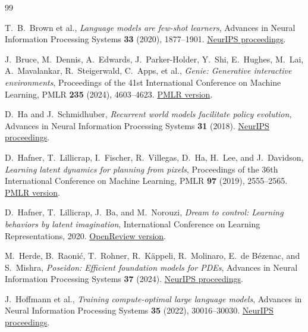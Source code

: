 \documentclass[11pt]{amsart}
\numberwithin{equation}{section}
\theoremstyle{definition}
\theoremstyle{plain}
\theoremstyle{remark}
\begin{document}
\begin{thebibliography}{99}

T.~B.~Brown et al.,
\emph{Language models are few-shot learners},
Advances in Neural Information Processing Systems \textbf{33} (2020),
1877--1901.
\href{https://proceedings.neurips.cc/paper/2020/hash/1457c0d6bfcb4967418bfb8ac142f64a-Abstract.html}
{NeurIPS proceedings}.

J.~Bruce, M.~Dennis, A.~Edwards, J.~Parker-Holder, Y.~Shi, E.~Hughes,
M.~Lai, A.~Mavalankar, R.~Steigerwald, C.~Apps, et al.,
\emph{Genie: Generative interactive environments},
Proceedings of the 41st International Conference on Machine Learning,
PMLR \textbf{235} (2024), 4603--4623.
\href{https://proceedings.mlr.press/v235/bruce24a.html}{PMLR version}.

D.~Ha and J.~Schmidhuber,
\emph{Recurrent world models facilitate policy evolution},
Advances in Neural Information Processing Systems \textbf{31} (2018).
\href{https://papers.nips.cc/paper_files/paper/2018/hash/2de5d16682c3c35007e4e92982f1a2ba-Abstract.html}
{NeurIPS proceedings}.

D.~Hafner, T.~Lillicrap, I.~Fischer, R.~Villegas, D.~Ha, H.~Lee, and
J.~Davidson,
\emph{Learning latent dynamics for planning from pixels},
Proceedings of the 36th International Conference on Machine Learning,
PMLR \textbf{97} (2019), 2555--2565.
\href{https://proceedings.mlr.press/v97/hafner19a.html}{PMLR version}.

D.~Hafner, T.~Lillicrap, J.~Ba, and M.~Norouzi,
\emph{Dream to control: Learning behaviors by latent imagination},
International Conference on Learning Representations, 2020.
\href{https://openreview.net/forum?id=S1lOTC4tDS}{OpenReview version}.

M.~Herde, B.~Raoni\'c, T.~Rohner, R.~K\"appeli, R.~Molinaro,
E.~de B\'ezenac, and S.~Mishra,
\emph{Poseidon: Efficient foundation models for PDEs},
Advances in Neural Information Processing Systems \textbf{37} (2024).
\href{https://proceedings.neurips.cc/paper_files/paper/2024/hash/84e1b1ec17bb11c57234e96433022a9a-Abstract-Conference.html}
{NeurIPS proceedings}.

J.~Hoffmann et al.,
\emph{Training compute-optimal large language models},
Advances in Neural Information Processing Systems \textbf{35} (2022),
30016--30030.
\href{https://proceedings.neurips.cc/paper_files/paper/2022/hash/c1e2faff6f588870935f114ebe04a3e5-Abstract-Conference.html}
{NeurIPS proceedings}.


\end{thebibliography}
\end{document}
